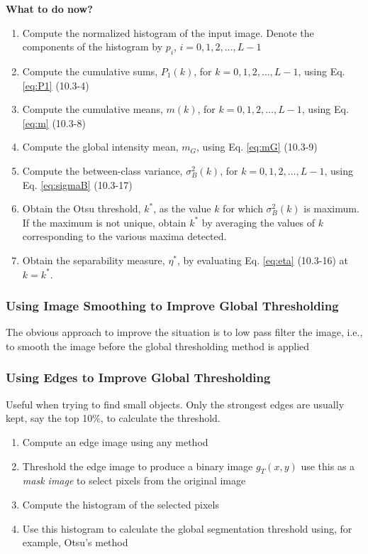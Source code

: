 \textbf{What to do now?}
\begin{enumerate}
	\item Compute the normalized histogram of the input image.
		Denote the components of the histogram by $p_i$, $i = 0, 1, 2, \ldots, L-1$
	\item Compute the cumulative sums, $P_1(k)$, for $k = 0, 1, 2, \ldots, L-1$, using Eq. \eqref{eq:P1} (10.3-4)
	\item Compute the cumulative means, $m(k)$, for $k = 0, 1, 2, \ldots, L-1$, using Eq. \eqref{eq:m} (10.3-8)
	\item Compute the global intensity mean, $m_G$, using Eq. \eqref{eq:mG} (10.3-9)
	\item Compute the between-class variance, $\sigma_B^2(k)$, for $k = 0, 1, 2, \ldots, L-1$, using Eq. \eqref{eq:sigmaB} (10.3-17)
	\item Obtain the Otsu threshold, $k^\ast$, as the value $k$ for which $\sigma_B^2(k)$ is maximum.
		If the maximum is not unique, obtain $k^\ast$ by averaging the values of $k$ corresponding to the various maxima detected.
	\item Obtain the separability measure, $\eta^\ast$, by evaluating Eq. \eqref{eq:eta} (10.3-16) at $k = k^\ast$.
\end{enumerate}

\subsubsection{Using Image Smoothing to Improve Global Thresholding}
The obvious approach to improve the situation is to low pass filter the image, i.e., to smooth the image before the global thresholding method is applied
\subsubsection{Using Edges to Improve Global Thresholding}
Useful when trying to find small objects.
Only the strongest edges are usually kept, say the top 10\%, to calculate the threshold.
\begin{enumerate}
	\item Compute an edge image using any method
	\item Threshold the edge image to produce a binary image $g_T(x,y)$ use
		this as a \emph{mask image} to select pixels from the original image
	\item Compute the histogram of the selected pixels
	\item Use this histogram to calculate the global segmentation threshold
		using, for example, Otsu's method
\end{enumerate}
